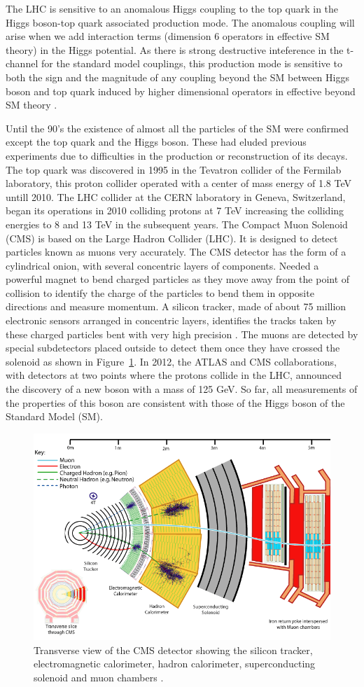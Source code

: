\documentclass[final,3p]{CSP}
\begin{document}
The LHC is sensitive to an anomalous Higgs coupling to the top quark in the Higgs boson-top quark associated production mode. 
The anomalous coupling will arise when we add interaction terms (dimension 6 operators in effective SM theory) in the Higgs potential.
As there is strong destructive inteference in the t-channel for the standard model  couplings, this production mode is sensitive to both the sign and the magnitude of any coupling beyond the SM between Higgs  boson and top quark induced by higher dimensional operators in effective beyond SM theory \cite{sirunyan2019search}.

Until the 90's the existence of almost all the particles of the SM were confirmed except the top quark and the Higgs boson. 
These had eluded previous experiments due to difficulties in the production or reconstruction of its decays. The top quark was 
discovered in 1995 in the Tevatron collider of the Fermilab laboratory, this proton collider operated with a center of mass 
energy of 1.8 TeV untill 2010. The LHC collider at the CERN laboratory in Geneva, Switzerland, began its operations in 2010 
colliding protons at 7 TeV increasing the colliding energies to 8 and 13 TeV in the subsequent years. The Compact Muon Solenoid (CMS) is based on the Large Hadron Collider (LHC). It is designed to detect particles known as muons very accurately. The CMS detector has the form of a cylindrical onion, with several concentric layers of components. Needed a powerful magnet to bend charged particles as they move away from the point of collision to identify the charge of the particles to bend them in opposite directions and measure momentum. A silicon tracker, made of about 75 
million electronic sensors arranged in concentric layers, identifies the tracks taken by these charged particles bent with very high precision \cite{Chatrchyan:2008aa}. The muons are detected by special subdetectors placed outside to detect them once they have crossed the solenoid as shown in Figure~\ref{figure5}. In 2012, the ATLAS and CMS collaborations, with detectors at two points where the protons collide in the LHC, announced the discovery of a new boson with a mass of 125 GeV. So far, all measurements of the properties of this boson are consistent with those of the Higgs boson of the Standard Model (SM).

  \begin{figure}[H]
    \centering
    \includegraphics[width=0.6\columnwidth]{./cms12.png}
    \caption{Transverse view of the CMS detector showing the silicon tracker, electromagnetic calorimeter, hadron calorimeter, superconducting solenoid and muon chambers \cite{Chatrchyan:2008aa}.}
    \label{figure5}
  \end{figure}
  
\end{document}

